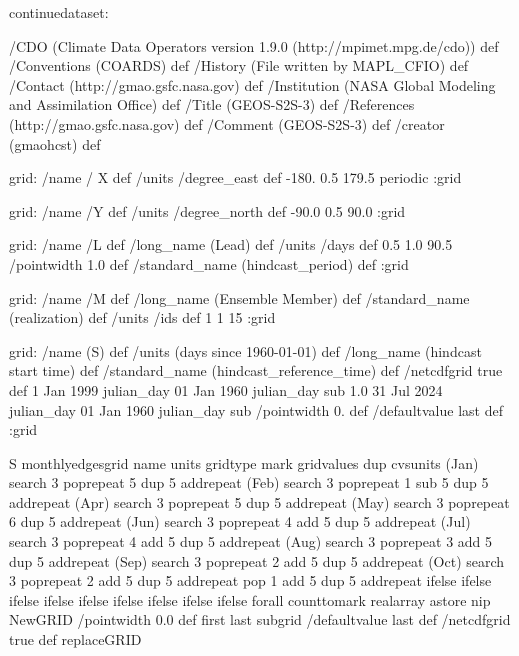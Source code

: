 \begin{ingrid}
continuedataset:

 /CDO (Climate Data Operators version 1.9.0 (http://mpimet.mpg.de/cdo)) def
 /Conventions (COARDS) def
 /History (File written by MAPL_CFIO) def
 /Contact (http://gmao.gsfc.nasa.gov) def
 /Institution (NASA Global Modeling and Assimilation Office) def
 /Title (GEOS-S2S-3) def
 /References (http://gmao.gsfc.nasa.gov) def
 /Comment (GEOS-S2S-3) def
 /creator (gmaohcst) def

grid:
/name / X def
/units /degree_east def
 -180. 0.5 179.5
periodic
:grid

grid:
/name /Y def
/units /degree_north def
 -90.0 0.5 90.0
:grid

grid:
/name /L def
/long_name (Lead) def
/units /days def
 0.5 1.0 90.5
/pointwidth 1.0 def
/standard_name (hindcast_period) def
:grid

grid:
/name /M def
/long_name (Ensemble Member) def
/standard_name (realization) def
/units /ids def
1 1 15
:grid

grid:
/name (S) def
/units (days since 1960-01-01) def
/long_name (hindcast start time) def
/standard_name (hindcast_reference_time) def
/netcdfgrid true def %
1 Jan 1999 julian_day 01 Jan 1960 julian_day sub
1.0
31 Jul 2024 julian_day %
01 Jan 1960 julian_day sub
/pointwidth 0. def
/defaultvalue { last } def
:grid

S monthlyedgesgrid
   name units gridtype mark gridvalues
        {dup cvsunits (Jan) search {3 {pop}repeat  5 {dup 5 add}repeat} { 
         (Feb) search {3 {pop}repeat 1 sub 5 {dup 5 add}repeat} { 
            (Apr) search {3 {pop}repeat 5 {dup 5 add}repeat} { 
               (May) search {3 {pop}repeat  6 {dup 5 add}repeat} { 
                  (Jun) search {3 {pop}repeat 4 add 5 {dup 5 add}repeat} { 
                     (Jul) search {3 {pop}repeat 4 add 5 {dup 5 add}repeat} {
                        (Aug) search {3 {pop}repeat 3 add 5 {dup 5 add}repeat} {
                            (Sep) search {3 {pop}repeat 2 add 5 {dup 5 add}repeat} {
                                (Oct) search {3 {pop}repeat 2 add 5 {dup 5 add}repeat}
                                  {pop 1 add 5 {dup 5 add}repeat}
                                ifelse}
                            ifelse}
                        ifelse}
                     ifelse}
                     ifelse}
                  ifelse}
               ifelse}
            ifelse}
         ifelse
         }forall counttomark realarray astore
        nip NewGRID
    /pointwidth 0.0 def
    first last  subgrid
    /defaultvalue { last } def
    /netcdfgrid true def %
    replaceGRID


\end{ingrid}

